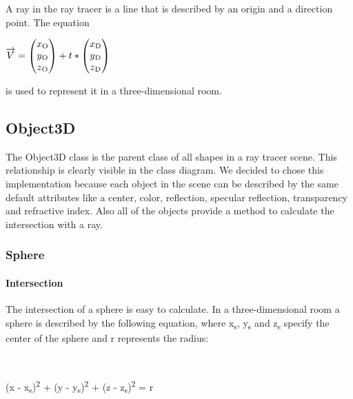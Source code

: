 \documentclass[10pt]{scrartcl}
\begin{document}
A ray in the ray tracer is a line that is described by an origin and a direction point. The equation 

\begin{center}

$ \overrightarrow{V} = \begin{pmatrix} x\textsubscript{O} \\  y\textsubscript{O} \\  z\textsubscript{O} \end{pmatrix} + t * \begin{pmatrix} x\textsubscript{D}  \\ y\textsubscript{D}  \\ z\textsubscript{D} \end{pmatrix}  $

\end{center}

is used to represent it in a three-dimensional room. 

\subsection{Object3D}

The Object3D class is the parent class of all shapes in a ray tracer scene. This relationship is clearly visible in the class diagram. We decided to chose this implementation because each object in the scene can be described by the same default attributes like a center, color, reflection, specular reflection, transparency and refractive index. Also all of the objects provide a method to calculate the intersection with a ray. 

\subsubsection{Sphere}

\paragraph{Intersection}

The intersection of a sphere is easy to calculate. In a three-dimensional room a sphere is described by the following equation, where x\textsubscript{s}, y\textsubscript{s} and z\textsubscript{s} specify the center of the sphere and r represents the radius:

\\
\begin{center}

(x - x\textsubscript{s})\textsuperscript{2} + (y - y\textsubscript{s})\textsuperscript{2} + (z - z\textsubscript{s})\textsuperscript{2} = r

\end{center}
\\
\end{document}

